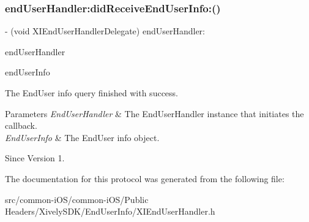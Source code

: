 \subsubsection{\texorpdfstring{end\+User\+Handler\+:did\+Receive\+End\+User\+Info\+:()}{endUserHandler:didReceiveEndUserInfo:()}}
{\footnotesize\ttfamily -\/ (void X\+I\+End\+User\+Handler\+Delegate) end\+User\+Handler\+: \begin{DoxyParamCaption}\item[{(id$<$ X\+I\+End\+User\+Handler $>$)}]{end\+User\+Handler }\item[{didReceiveEndUserInfo:(\hyperlink{class_x_i_end_user_info}{X\+I\+End\+User\+Info} $\ast$)}]{end\+User\+Info }\end{DoxyParamCaption}}



The End\+User info query finished with success. 


\begin{DoxyParams}{Parameters}
{\em End\+User\+Handler} & The End\+User\+Handler instance that initiates the callback. \\
\hline
{\em End\+User\+Info} & The End\+User info object. \\
\hline
\end{DoxyParams}
\begin{DoxySince}{Since}
Version 1. 
\end{DoxySince}


The documentation for this protocol was generated from the following file\+:\begin{DoxyCompactItemize}
\item 
src/common-\/i\+O\+S/common-\/i\+O\+S/\+Public Headers/\+Xively\+S\+D\+K/\+End\+User\+Info/X\+I\+End\+User\+Handler.\+h\end{DoxyCompactItemize}
